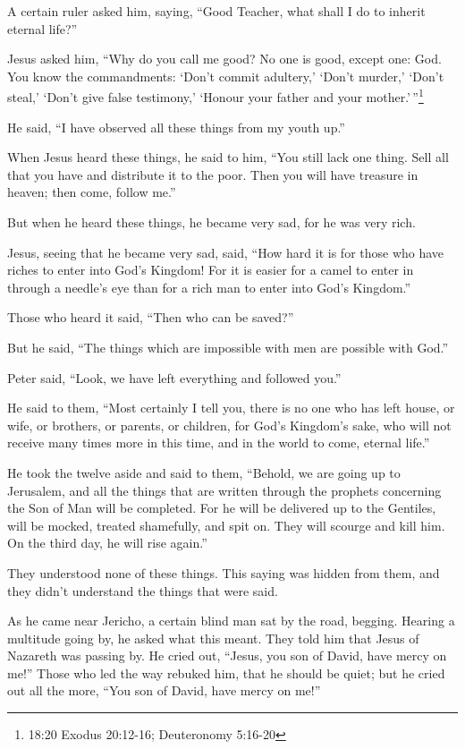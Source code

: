  A certain ruler asked him, saying, ``Good Teacher, what
shall I do to inherit eternal life?''

 Jesus asked him, ``Why do you call me good? No one is
good, except one: God.  You know the commandments: `Don't
commit adultery,' `Don't murder,' `Don't steal,' `Don't give false
testimony,' `Honour your father and your mother.'\,''\footnote{18:20
  Exodus 20:12-16; Deuteronomy 5:16-20}

 He said, ``I have observed all these things from my youth
up.''

 When Jesus heard these things, he said to him, ``You still
lack one thing. Sell all that you have and distribute it to the poor.
Then you will have treasure in heaven; then come, follow me.''

 But when he heard these things, he became very sad, for he
was very rich.

 Jesus, seeing that he became very sad, said, ``How hard it
is for those who have riches to enter into God's Kingdom! 
For it is easier for a camel to enter in through a needle's eye than for
a rich man to enter into God's Kingdom.''

 Those who heard it said, ``Then who can be saved?''

 But he said, ``The things which are impossible with men
are possible with God.''

 Peter said, ``Look, we have left everything and followed
you.''

 He said to them, ``Most certainly I tell you, there is no
one who has left house, or wife, or brothers, or parents, or children,
for God's Kingdom's sake,  who will not receive many times
more in this time, and in the world to come, eternal life.''

 He took the twelve aside and said to them, ``Behold, we
are going up to Jerusalem, and all the things that are written through
the prophets concerning the Son of Man will be completed. 
For he will be delivered up to the Gentiles, will be mocked, treated
shamefully, and spit on.  They will scourge and kill him.
On the third day, he will rise again.''

 They understood none of these things. This saying was
hidden from them, and they didn't understand the things that were said.

 As he came near Jericho, a certain blind man sat by the
road, begging.  Hearing a multitude going by, he asked what
this meant.  They told him that Jesus of Nazareth was
passing by.  He cried out, ``Jesus, you son of David, have
mercy on me!''  Those who led the way rebuked him, that he
should be quiet; but he cried out all the more, ``You son of David, have
mercy on me!''


